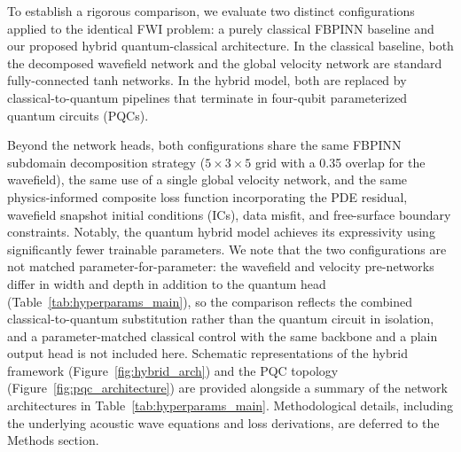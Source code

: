 \documentclass[11pt,a4paper]{article}
\begin{document}
To establish a rigorous comparison, we evaluate two distinct configurations applied to the identical FWI problem: a purely classical FBPINN baseline and our proposed hybrid quantum-classical architecture. In the classical baseline, both the decomposed wavefield network and the global velocity network are standard fully-connected tanh networks. In the hybrid model, both are replaced by classical-to-quantum pipelines that terminate in four-qubit parameterized quantum circuits (PQCs).

Beyond the network heads, both configurations share the same FBPINN subdomain decomposition strategy ($5\!\times\!3\!\times\!5$ grid with a 0.35 overlap for the wavefield), the same use of a single global velocity network, and the same physics-informed composite loss function incorporating the PDE residual, wavefield snapshot initial conditions (ICs), data misfit, and free-surface boundary constraints. Notably, the quantum hybrid model achieves its expressivity using significantly fewer trainable parameters. We note that the two configurations are not matched parameter-for-parameter: the wavefield and velocity pre-networks differ in width and depth in addition to the quantum head (Table~\ref{tab:hyperparams_main}), so the comparison reflects the combined classical-to-quantum substitution rather than the quantum circuit in isolation, and a parameter-matched classical control with the same backbone and a plain output head is not included here. Schematic representations of the hybrid framework (Figure~\ref{fig:hybrid_arch}) and the PQC topology (Figure~\ref{fig:pqc_architecture}) are provided alongside a summary of the network architectures in Table~\ref{tab:hyperparams_main}. Methodological details, including the underlying acoustic wave equations and loss derivations, are deferred to the Methods section.
\end{document}
